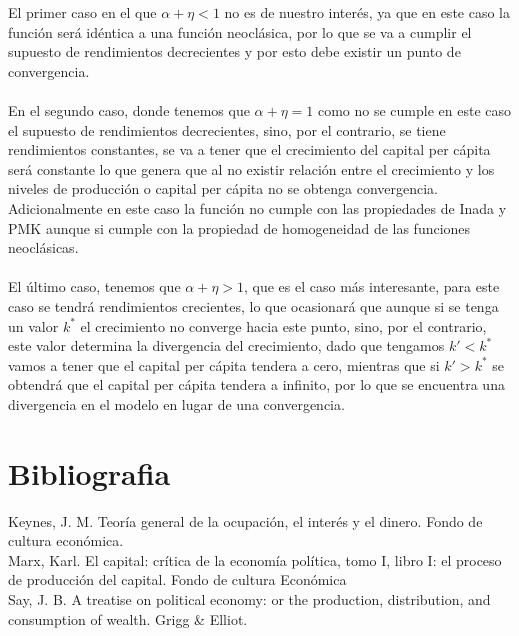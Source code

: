 \documentclass[letter,12pt]{article}
\begin{document}
\begin{flushleft}
El primer caso en el que $\alpha+\eta<1$ no es de nuestro interés, ya que en este caso la función será idéntica a una función neoclásica, por lo que se va a cumplir el supuesto de rendimientos decrecientes y por esto debe existir un punto de convergencia.\\
~\\
En el segundo caso, donde tenemos que $\alpha+\eta=1$ como no se cumple en este caso el supuesto de rendimientos decrecientes, sino, por el contrario, se tiene rendimientos constantes, se va a tener que el crecimiento del capital per cápita será constante lo que genera que al no existir relación entre el crecimiento y los niveles de producción o capital per cápita no se obtenga convergencia. Adicionalmente en este caso la función no cumple con las propiedades de Inada y PMK aunque si cumple con la propiedad de homogeneidad de las funciones neoclásicas.\\
~\\
El último caso, tenemos que $\alpha+\eta>1$, que es el caso más interesante, para este caso se tendrá rendimientos crecientes, lo que ocasionará que aunque si se tenga un valor $k^*$ el crecimiento no converge hacia este punto, sino, por el contrario, este valor determina la divergencia del crecimiento, dado que tengamos $k'<k^*$ vamos a tener que el capital per cápita tendera a cero, mientras que si $k'>k^*$ se obtendrá que el capital per cápita tendera a infinito, por lo que se encuentra una divergencia en el modelo en lugar de una convergencia. 

\newpage
\end{flushleft}

\section{Bibliografia}

\begin{flushleft}
    Keynes, J. M. Teoría general de la ocupación, el interés y el dinero. Fondo de cultura económica.\\
    Marx, Karl. El capital: crítica de la economía política, tomo I, libro I: el proceso de producción del capital. Fondo de cultura Económica\\
    Say, J. B. A treatise on political economy: or the production, distribution, and consumption of wealth. Grigg & Elliot.
    
\end{flushleft}
\end{document}
